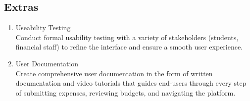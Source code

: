 \documentclass{article}
\begin{document}
\subsection{Extras}

\begin{enumerate}
    \item Useability Testing \\
    Conduct formal usability testing with a variety of stakeholders (students, financial staff) to refine the interface and ensure a smooth user experience.
    \item User Documentation \\
    Create comprehensive user documentation in the form of written documentation and video tutorials that guides end-users through every step of submitting expenses, reviewing budgets, and navigating the platform.
\end{enumerate}
\end{document}
